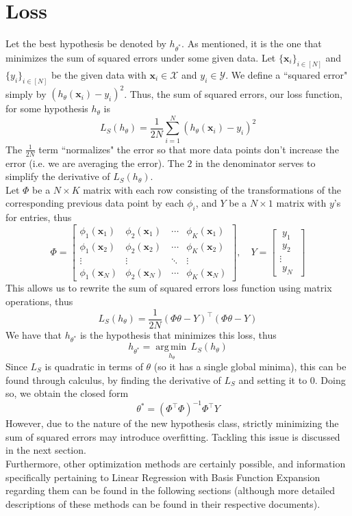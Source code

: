 \documentclass[12pt]{article}
\newcommand{\argmin}[1]{\underset{#1}{\operatorname{arg\,min\,}}}
\begin{document}
\section{Loss}

Let the best hypothesis be denoted by $h_{\theta^*}$. As mentioned, it is the one that minimizes the sum of squared errors under some given data. Let $\{\mathbf{x}_i\}_{i\in[N]}$ and $\{y_i\}_{i\in[N]}$ be the given data with $\mathbf{x}_i \in \mathcal{X}$ and $y_i \in \mathcal{Y}$. We define a ``squared error"  simply by $(h_\theta(\mathbf{x}_i) - y_i)^2$. Thus, the sum of squared errors, our loss function, for some hypothesis $h_\theta$ is
\[ L_S(h_\theta) = \frac{1}{2N}\sum_{i=1}^{N}(h_\theta(\mathbf{x}_i) - y_i)^2 \]
The $\frac{1}{2N}$ term ``normalizes" the error so that more data points don't increase the error (i.e. we are averaging the error). The $2$ in the denominator serves to simplify the derivative of $L_S(h_\theta)$.
\\\newline
Let $\Phi$ be a $N{\times}K$ matrix with each row consisting of the transformations of the corresponding previous data point by each $\phi_i$, and $Y$ be a $N{\times}1$ matrix with $y$'s for entries, thus
\[
	\Phi =
		\begin{bmatrix}
		\phi_1(\mathbf{x}_1) & \phi_2(\mathbf{x}_1) & \cdots & \phi_K (\mathbf{x}_1) \\
		\phi_1(\mathbf{x}_2) & \phi_2(\mathbf{x}_2) & \cdots & \phi_K (\mathbf{x}_2) \\
		\vdots & \vdots & \ddots & \vdots \\
		\phi_1(\mathbf{x}_N) & \phi_2(\mathbf{x}_N) & \cdots & \phi_K (\mathbf{x}_N) 
	\end{bmatrix}
	, \quad
	Y =
	\begin{bmatrix}
		\; y_1 \; \\
		\; y_2 \; \\
		\vdots \\
		\; y_N \;
	\end{bmatrix}
\]
This allows us to rewrite the sum of squared errors loss function using matrix operations, thus
\[ L_S(h_\theta) = \frac{1}{2N}(\Phi\theta - Y)^\top(\Phi\theta - Y) \]
We have that $h_{\theta^*}$ is the hypothesis that minimizes this loss, thus
\[ h_{\theta^*} = \argmin{h_\theta}L_S(h_\theta) \]
Since $L_S$ is quadratic in terms of $\theta$ (so it has a single global minima), this can be found through calculus, by finding the derivative of $L_S$ and setting it to $0$. Doing so, we obtain the closed form
\[ \theta^* = (\Phi^\top \Phi)^{-1} \Phi^\top Y \]
However, due to the nature of the new hypothesis class, strictly minimizing the sum of squared errors may introduce overfitting. Tackling this issue is discussed in the next section.
\\\newline
Furthermore, other optimization methods are certainly possible, and information specifically pertaining to Linear Regression with Basis Function Expansion regarding them can be found in the following sections (although more detailed descriptions of these methods can be found in their respective documents).
\end{document}
